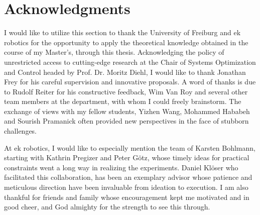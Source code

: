 \chapter{Acknowledgments}

I would like to utilize this section to thank the University of Freiburg and ek robotics for the opportunity to apply the theoretical knowledge obtained in the course of my Master's, through this thesis. Acknowledging the policy of unrestricted access to cutting-edge research at the Chair of Systems Optimization and Control headed by Prof. Dr. Moritz Diehl, I would like to thank Jonathan Frey for his careful supervision and innovative proposals. A word of thanks is due to Rudolf Reiter for his constructive feedback, Wim Van Roy and several other team members at the department, with whom I could freely brainstorm. The exchange of views with my fellow students, Yizhen Wang, Mohammed Hababeh and Sourish Pramanick often provided new perspectives in the face of stubborn challenges. 
\par At ek robotics, I would like to especially mention the team of Karsten Bohlmann, starting with Kathrin Pregizer and Peter Götz, whose timely ideas for practical constraints went a long way in realizing the experiments. Daniel Klöser who facilitated this collaboration, has been an exemplary advisor whose patience and meticulous direction have been invaluable from ideation to execution. I am also thankful for friends and family whose encouragement kept me motivated and in good cheer, and God almighty for the strength to see this through.